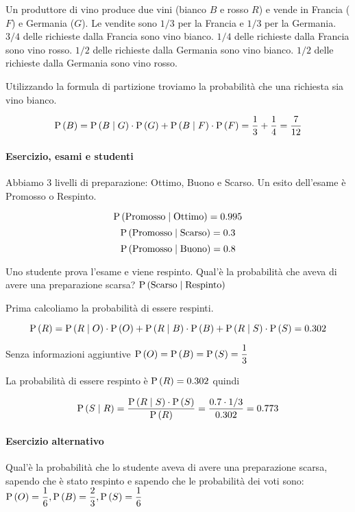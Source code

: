 Un produttore di vino produce due vini (bianco $ B $ e rosso $ R $) e vende in Francia ($ F $) e Germania ($ G $). 
Le vendite sono $ 1/3 $ per la Francia e $ 1/3 $ per la Germania. $ 3/4 $ delle richieste dalla Francia sono vino bianco. $ 1/4 $ delle richieste dalla Francia sono vino rosso. $ 1/2 $ delle richieste dalla Germania sono vino bianco. $ 1/2 $ delle richieste dalla Germania sono vino rosso.

Utilizzando la formula di partizione troviamo la probabilità che una richiesta sia vino bianco.

\[ \text{P}\left(B\right) = \text{P}\left(B \mid G\right) \cdot \text{P}\left(G\right) + \text{P}\left(B \mid F\right) \cdot \text{P}\left(F\right) = \dfrac{1}{3} + \dfrac{1}{4} = \dfrac{7}{12} \]

\paragraph{Esercizio, esami e studenti}

Abbiamo 3 livelli di preparazione: Ottimo, Buono e Scarso.
Un esito dell'esame è Promosso o Respinto.

\[ \text{P}\left(\text{Promosso}  \mid  \text{Ottimo}\right) = 0.995\]
\[ \text{P}\left(\text{Promosso}  \mid  \text{Scarso}\right) = 0.3\]
\[ \text{P}\left(\text{Promosso}  \mid  \text{Buono}\right) = 0.8\]

Uno studente prova l'esame e viene respinto. Qual'è la probabilità che aveva di avere una preparazione scarsa? $ \text{P}\left(\text{Scarso} \mid \text{Respinto}\right) $

Prima calcoliamo la probabilità di essere respinti.

\[ \text{P}\left(R\right) = \text{P}\left(R \mid O\right) \cdot \text{P}\left(O\right) + \text{P}\left(R  \mid  B\right) \cdot \text{P}\left(B\right) + \text{P}\left(R \mid S\right) \cdot \text{P}\left(S\right) = 0.302 \]

Senza informazioni aggiuntive $ \text{P}\left(O\right) = \text{P}\left(B\right) = \text{P}\left(S\right) = \dfrac{1}{3} $

La probabilità di essere respinto è $ \text{P}\left(R\right) = 0.302 $ quindi 

\[ \text{P}\left(S  \mid  R\right) = \dfrac{\text{P}\left(R \mid S\right)\cdot \text{P}\left(S\right)}{\text{P}\left(R\right)} = \dfrac{0.7 \cdot 1/3}{0.302} = 0.773 \]

\paragraph{Esercizio alternativo}

Qual'è la probabilità che lo studente aveva di avere una preparazione scarsa, sapendo che è stato respinto e sapendo che le probabilità dei voti sono: $ \text{P}\left(O\right) = \dfrac{1}{6}, \text{P}\left(B\right) = \dfrac{2}{3}, \text{P}\left(S\right) = \dfrac{1}{6} $

